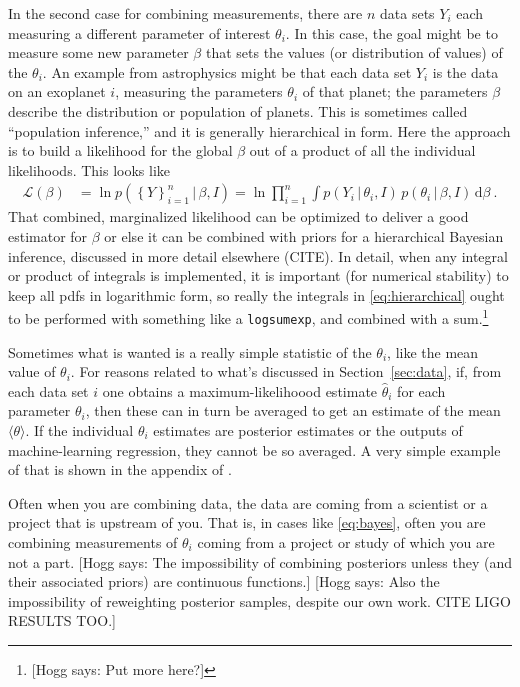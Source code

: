 \documentclass{article}
\newcommand{\sectionname}{Section}
\newcommand{\secref}[1]{\sectionname~\ref{#1}}
\newcommand{\dd}{\mathrm{d}}
\newcommand{\given}{\,|\,}
\newcommand{\setof}[1]{\left\{{#1}\right\}}
\newcommand{\hogg}[1]{{\color{blue}[Hogg says: {#1}]}}
\begin{document}
In the second case for combining measurements, there are $n$ data sets $Y_i$ each measuring a different parameter of interest $\theta_i$.
In this case, the goal might be to measure some new parameter $\beta$ that sets the values (or distribution of values) of the $\theta_i$.
An example from astrophysics might be that each data set $Y_i$ is the data on an exoplanet $i$, measuring the parameters $\theta_i$ of that planet; the parameters $\beta$ describe the distribution or population of planets.
This is sometimes called ``population inference,'' and it is generally hierarchical in form.
Here the approach is to build a likelihood for the global $\beta$ out of a product of all the individual likelihoods.
This looks like
\begin{align}
    \mathscr{L}(\beta) &= \ln p(\setof{Y}_{i=1}^n\given\beta,I)
    = \ln\prod_{i=1}^n \int p(Y_i\given\theta_i,I)\,p(\theta_i\given\beta,I)\,\dd\beta ~.\label{eq:hierarchical}
\end{align}
That combined, marginalized likelihood can be optimized to deliver a good estimator for $\beta$ or else it can be combined with priors for a hierarchical Bayesian inference, discussed in more detail elsewhere (CITE).
In detail, when any integral or product of integrals is implemented, it is important (for numerical stability) to keep all pdfs in logarithmic form, so really the integrals in \eqref{eq:hierarchical} ought to be performed with something like a \texttt{logsumexp}, and combined with a sum.\footnote{\hogg{Put more here?}}

Sometimes what is wanted is a really simple statistic of the $\theta_i$, like the mean value of $\theta_i$.
For reasons related to what's discussed in \secref{sec:data}, if, from each data set $i$ one obtains a maximum-likelihoood estimate $\hat\theta_i$ for each parameter $\theta_i$, then these can in turn be averaged to get an estimate of the mean $\langle\theta\rangle$.
If the individual $\theta_i$ estimates are posterior estimates or the outputs of machine-learning regression, they cannot be so averaged.
A very simple example of that is shown in the appendix of \cite{goodorbad}.

Often when you are combining data, the data are coming from a scientist or a project that is upstream of you.
That is, in cases like \eqref{eq:bayes}, often you are combining measurements of $\theta_i$ coming from a project or study of which you are not a part.
\hogg{The impossibility of combining posteriors unless they (and their associated priors) are continuous functions.}
\hogg{Also the impossibility of reweighting posterior samples, despite our own work. CITE LIGO RESULTS TOO.}
\end{document}
